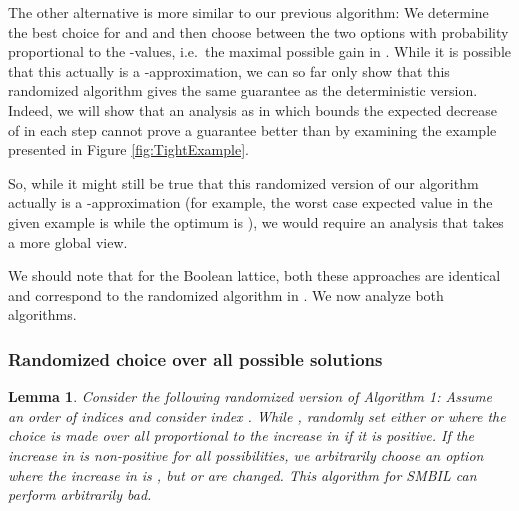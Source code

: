 \documentclass{article}
\theoremstyle{plain}
\newtheorem{lemma}[theorem]{Lemma}
\theoremstyle{definition}
\begin{document}
The other alternative is more similar to our previous algorithm: We determine the best choice for  and  and then choose
between the two options with probability proportional to the -values, i.e.\ the maximal possible gain in .
While it is possible that this actually is a -approximation, 
we can so far only show that this randomized algorithm gives the same guarantee as the deterministic version.
Indeed, we will show that an analysis as in \cite{DoubleGreedy} which bounds the expected decrease of 
 in each step cannot prove a guarantee better than  by examining the example 
presented in Figure \ref{fig:TightExample}. 

So, while it might still be true that this randomized version of our algorithm actually is a -approximation 
(for example, the worst case expected value in the given example is  while the optimum is ), 
we would require an analysis that takes a more global view. 

We should note that for the Boolean lattice, both these approaches are identical and  correspond to the randomized algorithm in 
\cite{DoubleGreedy}. We now analyze both algorithms. 

\subsubsection{Randomized choice over all possible solutions}\label{subsec:RandBadAllPossible}

\begin{lemma}\label{AllRandChoicesBadLemma}
Consider the following randomized version of Algorithm 1: Assume an order of indices and 
consider index . While , randomly set either  or  where the choice is made over all 
 proportional to the increase in  if it is positive. 
If the increase in  is non-positive for all possibilities, we arbitrarily choose an option where the increase in  is , 
but  or  are changed.     
This algorithm for SMBIL can perform arbitrarily bad. 


\end{lemma}
\end{document}
